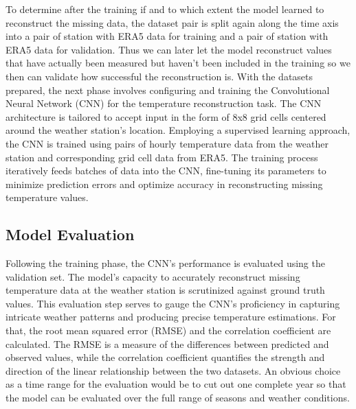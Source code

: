 To determine after the training if and to which extent the model learned to reconstruct the missing data, the dataset pair is split again along the time axis into a pair of station with ERA5 data for training and a pair of station with ERA5 data for validation. Thus we can later let the model reconstruct values that have actually been measured but haven't been included in the training so we then can validate how successful the reconstruction is. With the datasets prepared, the next phase involves configuring and training the Convolutional Neural Network (CNN) for the temperature reconstruction task. The CNN architecture is tailored to accept input in the form of 8x8 grid cells centered around the weather station's location. Employing a supervised learning approach, the CNN is trained using pairs of hourly temperature data from the weather station and corresponding grid cell data from ERA5. The training process iteratively feeds batches of data into the CNN, fine-tuning its parameters to minimize prediction errors and optimize accuracy in reconstructing missing temperature values.


\subsection{Model Evaluation}
Following the training phase, the CNN's performance is evaluated using the validation set. The model's capacity to accurately reconstruct missing temperature data at the weather station is scrutinized against ground truth values. This evaluation step serves to gauge the CNN's proficiency in capturing intricate weather patterns and producing precise temperature estimations. For that, the root mean squared error (RMSE) and the correlation coefficient are calculated. The RMSE is a measure of the differences between predicted and observed values, while the correlation coefficient quantifies the strength and direction of the linear relationship between the two datasets. An obvious choice as a time range for the evaluation would be to cut out one complete year so that the model can be evaluated over the full range of seasons and weather conditions. 

